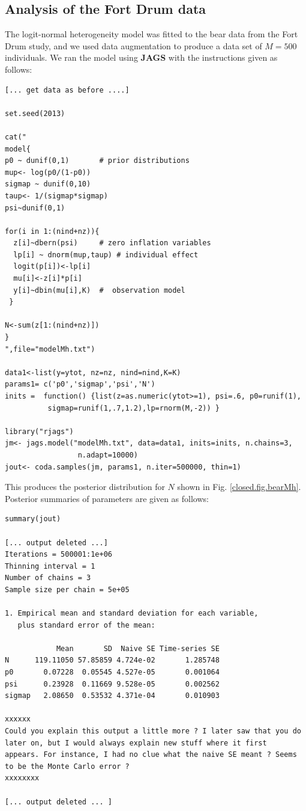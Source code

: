 \subsection{Analysis of the Fort Drum data}
\label{closed.sec.Mhbear}
The logit-normal heterogeneity model was fitted to the bear data from
the Fort Drum study, and we used data augmentation to produce a data
set of $M=500$ individuals.  We ran the model using {\bf JAGS} with
the instructions given as follows:
{\small
\begin{verbatim}
[... get data as before ....]

set.seed(2013)

cat("
model{
p0 ~ dunif(0,1)       # prior distributions
mup<- log(p0/(1-p0))
sigmap ~ dunif(0,10)
taup<- 1/(sigmap*sigmap)
psi~dunif(0,1)

for(i in 1:(nind+nz)){
  z[i]~dbern(psi)     # zero inflation variables
  lp[i] ~ dnorm(mup,taup) # individual effect
  logit(p[i])<-lp[i]
  mu[i]<-z[i]*p[i]
  y[i]~dbin(mu[i],K)  #  observation model
 }

N<-sum(z[1:(nind+nz)])
}
",file="modelMh.txt")

data1<-list(y=ytot, nz=nz, nind=nind,K=K)
params1= c('p0','sigmap','psi','N')
inits =  function() {list(z=as.numeric(ytot>=1), psi=.6, p0=runif(1),
          sigmap=runif(1,.7,1.2),lp=rnorm(M,-2)) }

library("rjags")
jm<- jags.model("modelMh.txt", data=data1, inits=inits, n.chains=3,
                 n.adapt=10000)
jout<- coda.samples(jm, params1, n.iter=500000, thin=1)
\end{verbatim}
}
This produces the posterior distribution for $N$ shown
in Fig. \ref{closed.fig.bearMh}. Posterior summaries of parameters are
given as follows:
{\small
\begin{verbatim}
summary(jout)

[... output deleted ...]
Iterations = 500001:1e+06
Thinning interval = 1
Number of chains = 3
Sample size per chain = 5e+05

1. Empirical mean and standard deviation for each variable,
   plus standard error of the mean:

            Mean       SD  Naive SE Time-series SE
N      119.11050 57.85859 4.724e-02       1.285748
p0       0.07228  0.05545 4.527e-05       0.001064
psi      0.23928  0.11669 9.528e-05       0.002562
sigmap   2.08650  0.53532 4.371e-04       0.010903

xxxxxx
Could you explain this output a little more ? I later saw that you do
later on, but I would always explain new stuff where it first
appears. For instance, I had no clue what the naive SE meant ? Seems
to be the Monte Carlo error ?
xxxxxxxx

[... output deleted ... ]
\end{verbatim}
}

